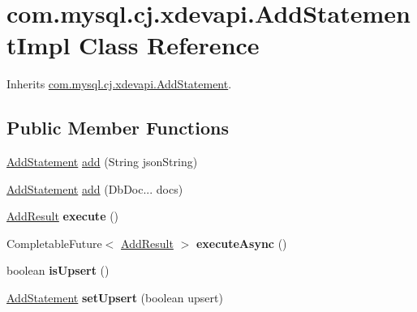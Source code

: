 \hypertarget{classcom_1_1mysql_1_1cj_1_1xdevapi_1_1_add_statement_impl}{}\section{com.\+mysql.\+cj.\+xdevapi.\+Add\+Statement\+Impl Class Reference}
\label{classcom_1_1mysql_1_1cj_1_1xdevapi_1_1_add_statement_impl}


Inherits \mbox{\hyperlink{interfacecom_1_1mysql_1_1cj_1_1xdevapi_1_1_add_statement}{com.\+mysql.\+cj.\+xdevapi.\+Add\+Statement}}.

\subsection*{Public Member Functions}
\begin{DoxyCompactItemize}
\item 
\mbox{\hyperlink{interfacecom_1_1mysql_1_1cj_1_1xdevapi_1_1_add_statement}{Add\+Statement}} \mbox{\hyperlink{classcom_1_1mysql_1_1cj_1_1xdevapi_1_1_add_statement_impl_abba297ed8c7bfb2afad21bebcb3ca13a}{add}} (String json\+String)
\item 
\mbox{\hyperlink{interfacecom_1_1mysql_1_1cj_1_1xdevapi_1_1_add_statement}{Add\+Statement}} \mbox{\hyperlink{classcom_1_1mysql_1_1cj_1_1xdevapi_1_1_add_statement_impl_a59bdfcc8a26ee55966f9a1ad5a7b2303}{add}} (Db\+Doc... docs)
\item 
\mbox{\label{classcom_1_1mysql_1_1cj_1_1xdevapi_1_1_add_statement_impl_a4448de4bfd47a9a6316509ff4ca0b9d1}} 
\mbox{\hyperlink{interfacecom_1_1mysql_1_1cj_1_1xdevapi_1_1_add_result}{Add\+Result}} {\bfseries execute} ()
\item 
\mbox{\label{classcom_1_1mysql_1_1cj_1_1xdevapi_1_1_add_statement_impl_abd553acbd2c91815014b2708a26ccb8f}} 
Completable\+Future$<$ \mbox{\hyperlink{interfacecom_1_1mysql_1_1cj_1_1xdevapi_1_1_add_result}{Add\+Result}} $>$ {\bfseries execute\+Async} ()
\item 
\mbox{\label{classcom_1_1mysql_1_1cj_1_1xdevapi_1_1_add_statement_impl_ac138d6c3ba88d8d8b1d90703decb0908}} 
boolean {\bfseries is\+Upsert} ()
\item 
\mbox{\label{classcom_1_1mysql_1_1cj_1_1xdevapi_1_1_add_statement_impl_a8470fab763b1cfa3555d5dfd7854df2c}} 
\mbox{\hyperlink{interfacecom_1_1mysql_1_1cj_1_1xdevapi_1_1_add_statement}{Add\+Statement}} {\bfseries set\+Upsert} (boolean upsert)
\end{DoxyCompactItemize}


